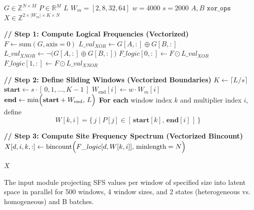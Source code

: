 \documentclass{article}
\begin{document}
\begin{algorithm}
\caption{ProcessGenotypeMatrixAndPositions (Vectorized)}\label{alg:vectorized}
\begin{algorithmic}[1]
\Require $G \in \mathbb{Z}^{N \times M}$ 
\Require $P \in \mathbb{R}^M$ 
\Require $L$ 
\Require $W_m = [2, 8, 32, 64]$ 
\Require $w = 4000$ 
\Require $s = 2000$ 
\Require $A, B$ 
\Require $\texttt{xor\_ops}$ 
\Ensure $X \in \mathbb{Z}^{2 \times |W_m| \times K \times N}$ 

\State \textbf{// Step 1: Compute Logical Frequencies (Vectorized)}
\State $F \gets \text{sum}(G,\text{axis}=0)$ 
\State $L\_val_{XOR} \gets G[A, :] \oplus G[B, :]$
\State $L\_val_{XNOR} \gets \neg\bigl(G[A, :] \oplus G[B, :]\bigr)$
\State \quad
\State $F\_logic[0, :] \gets F \odot L\_val_{XOR}$ 
\State $F\_logic[1, :] \gets F \odot L\_val_{XNOR}$ 
\medskip

\State \textbf{// Step 2: Define Sliding Windows (Vectorized Boundaries)}
\State $K \gets \lceil L/s \rceil$
\State $\mathbf{start} \gets s \cdot [\,0,1,\ldots, K-1\,]$ 
    \State $W_{\text{end}}[i] \gets w \cdot W_m[i]$
\EndFor
\State $\mathbf{end} \gets \min\Bigl(\mathbf{start} + W_{\text{end}},\, L\Bigr)$ 
\State \quad
\State \textbf{For each} window index $k$ and multiplier index $i$, define
\[
W[k,i] = \{\, j \mid P[j] \in [\,\mathbf{start}[k],\, \mathbf{end}[i]\,] \,\}
\]

\State \textbf{// Step 3: Compute Site Frequency Spectrum (Vectorized Bincount)}
            \State $X[d,i,k,:] \gets \text{bincount}\Bigl(F\_logic[d, W[k,i]],\, \text{minlength}=N\Bigr)$
        \EndFor
    \EndFor
\EndFor
\medskip

\State \Return $X$
\end{algorithmic}
\label{alg:alg1}
\end{algorithm}


The input module projecting SFS values per window of specified size into latent space in parallel for 500 windows, 4 window sizes, and 2 states (heterogeneous vs. homogeneous) and B batches.
\end{document}
